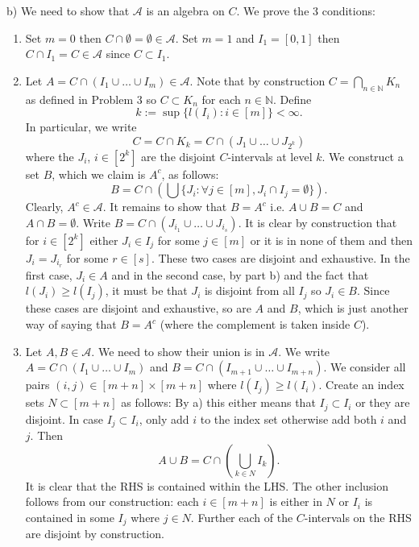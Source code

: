 \documentclass[12pt]{amsart} %
\def\N{\mathbb{N}}
\def\A{\mathcal{A}}
\begin{document}
\smallskip
b) We need to show that  $\mathcal{A} $ is an algebra on $C$. We prove the 3 conditions:
\begin{enumerate}
	\item Set $m=0$ then  $C \cap \emptyset = \emptyset \in \A$. Set $m=1$ and  $I_1 = [0,1]$ then  $C \cap I_1 = C \in \A$ since  $C \subset I_1$.
	\item Let $A = C \cap \left( I_1 \cup \ldots \cup I_m \right) \in \A$. Note that by construction $C = \bigcap_{n \in \N}K_n$ as defined in Problem 3 so $C \subset K_n$ for each $n \in \N$. Define $$k := \sup \{l(I_i): i \in [m]\} < \infty.$$ In particular, we write $$C = C \cap K_k = C \cap \left( J_1 \cup \ldots \cup J_{2^k} \right)$$ where the $J_i$,  $i \in [2^k]$ are the disjoint  $C$-intervals at level  $k$. We construct a set $B$, which we claim is $A^c$, as follows: $$B = C \cap \left( \bigcup\{J_i : \forall j \in [m],  J_i \cap  I_j = \emptyset\} \right) .$$ Clearly, $A^c \in \A$. It remains to show that $B = A^c$ i.e.  $A\cup B = C$ and  $A\cap B = \emptyset$. Write $B = C \cap \left( J_{i_1} \cup \ldots \cup J_{i_s} \right)$. It is clear by construction that for  $i \in [2^k]$ either $J_i \in I_j$ for some $j \in [m]$ or it is in none of them and then $J_i = J_{i_{r}}$ for some $r \in [s]$. These two cases are disjoint and exhaustive. In the first case, $J_i \in A$ and in the second case, by part b) and the fact that $l(J_i) \ge l(I_j)$, it must be that $J_i$ is disjoint from all $I_j$ so  $J_i \in B$. Since these cases are disjoint and exhaustive, so are $A$ and  $B$, which is just another way of saying that $B = A^c$ (where the complement is taken inside  $C$).  



\item Let $A, B \in \A$. We need to show their union is in $\A$. We write $A = C \cap
	\left( I_1 \cup \ldots\cup I_m \right)$ and $B = C \cap \left( I_{m+1} \cup \ldots \cup I_{m+n} \right)$. We consider all pairs $\left( i, j \right) \in [m+n]\times [m+n]$ where $l(I_j) \ge l(I_i)$. Create an index sets $N \subset [m+n]$ as follows: By a) this either means that $I_j \subset I_i$ or they are disjoint. In case $I_j \subset I_i$, only add $i$ to the index set otherwise add both  $i$ and  $j$. Then $$A \cup B = C \cap \left( \bigcup_{k \in N} I_k \right).$$ It is clear that the RHS is contained within the LHS. The other inclusion follows from our construction: each $i \in [m+n]$ is either in $N$ or  $I_i$ is contained in some  $I_j$ where  $j \in N$. Further each of the $C$-intervals on the RHS are disjoint by construction. 
\end{enumerate}
\end{document}
